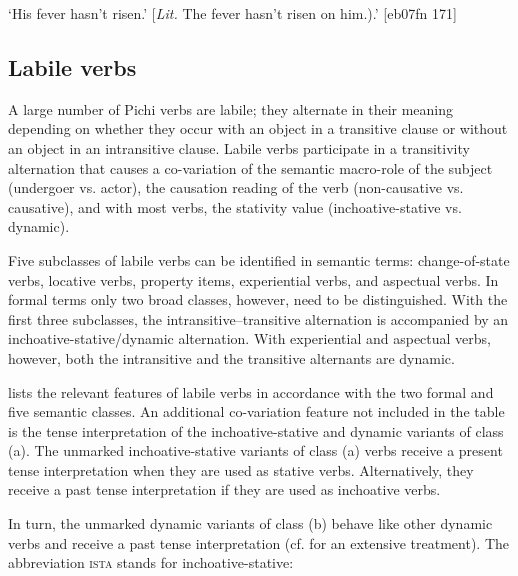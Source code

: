 \glt ‘His fever hasn’t risen.’ [\textit{Lit.} The fever hasn’t risen on him.).’ [eb07fn 171]
\z

\subsection{Labile verbs} \label{sec:9.2.3}

A large number of Pichi verbs are labile; they alternate in their meaning depending on whether they occur with an object in a transitive clause or without an object in an intransitive clause. Labile verbs participate in a transitivity alternation that causes a co-variation of the semantic macro-role of the subject (undergoer vs. actor), the causation reading of the verb (non-causative vs. causative), and with most verbs, the stativity value (inchoative-stative vs. dynamic).


Five subclasses of labile verbs can be identified in semantic terms: change-of-state verbs, locative verbs, property items, experiential verbs, and aspectual verbs. In formal terms only two broad classes, however, need to be distinguished. With the first three subclasses, the intransitive–transitive alternation is accompanied by an inchoative-stative/dynamic alternation. With experiential and aspectual verbs, however, both the intransitive and the transitive alternants are dynamic. 


 lists the relevant features of labile verbs in accordance with the two formal and five semantic classes. An additional co-variation feature not included in the table is the tense interpretation of the inchoative-stative and dynamic variants of class (a). The unmarked inchoative-stative variants of class (a) verbs receive a present tense interpretation when they are used as stative verbs. Alternatively, they receive a past tense interpretation if they are used as inchoative verbs.

In turn, the unmarked dynamic variants of class (b) behave like other dynamic verbs and receive a past tense interpretation (cf.  for an extensive treatment). The abbreviation \textsc{ista} stands for inchoative-stative: 


